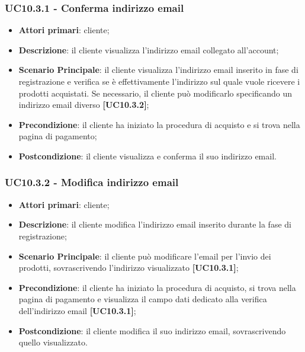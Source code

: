 \subsubsection{UC10.3.1 - Conferma indirizzo email}
\begin{itemize}
\item \textbf{Attori primari}: cliente;
\item \textbf{Descrizione}: il cliente visualizza l'indirizzo email collegato all'account;
\item \textbf{Scenario Principale}: il cliente visualizza l'indirizzo email inserito in fase di registrazione e verifica se è effettivamente l'indirizzo sul quale vuole ricevere i prodotti acquistati. Se necessario, il cliente può modificarlo specificando un indirizzo email diverso \textbf{[UC10.3.2]};
\item \textbf{Precondizione}:  il cliente ha iniziato la procedura di acquisto e si trova nella pagina di pagamento;
\item \textbf{Postcondizione}: il cliente visualizza e conferma il suo indirizzo email.
\end{itemize}

\subsubsection{UC10.3.2 - Modifica indirizzo email}
\begin{itemize}
\item \textbf{Attori primari}: cliente;
\item \textbf{Descrizione}: il cliente modifica l'indirizzo email inserito durante la fase di registrazione;
\item \textbf{Scenario Principale}: il cliente può modificare l'email per l'invio dei prodotti, sovrascrivendo l'indirizzo visualizzato \textbf{[UC10.3.1]};
\item \textbf{Precondizione}:  il cliente ha iniziato la procedura di acquisto, si trova nella pagina di pagamento e visualizza il campo dati dedicato alla verifica dell'indirizzo email \textbf{[UC10.3.1]};
\item \textbf{Postcondizione}: il cliente modifica il suo indirizzo email, sovrascrivendo quello visualizzato.
\end{itemize}

